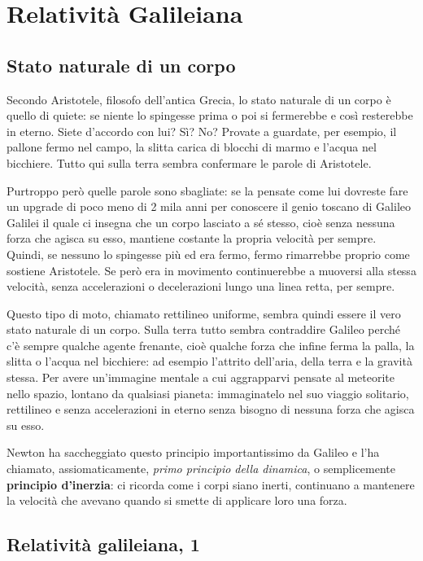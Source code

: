 ﻿
\chapter{Relatività Galileiana}

\section{Stato naturale di un corpo}

Secondo Aristotele, filosofo dell’antica Grecia,  lo stato naturale di un corpo è quello di quiete: se niente lo spingesse prima o poi si fermerebbe e così resterebbe in eterno. Siete d’accordo con lui? Sì? No? Provate a guardate, per esempio, il pallone fermo nel campo, la slitta carica di blocchi di marmo e l’acqua nel bicchiere. Tutto qui sulla terra sembra confermare le parole di Aristotele.

Purtroppo però quelle parole sono sbagliate: se la pensate come lui dovreste fare un upgrade di poco meno di 2 mila anni per  conoscere il genio toscano di Galileo Galilei il quale ci insegna che un corpo lasciato a sé stesso, cioè senza nessuna forza che agisca su esso, mantiene costante la propria velocità per sempre. Quindi, se nessuno lo spingesse più ed era fermo, fermo rimarrebbe proprio come sostiene Aristotele. Se però era in movimento continuerebbe a muoversi alla stessa velocità, senza accelerazioni o decelerazioni lungo una linea retta, per sempre. 

Questo tipo di moto, chiamato rettilineo uniforme, sembra quindi essere il vero stato naturale di un corpo. Sulla terra tutto sembra contraddire Galileo perché c’è sempre qualche agente frenante, cioè qualche forza che infine ferma la palla, la slitta o l'acqua nel bicchiere: ad esempio l’attrito dell’aria, della terra e la gravità stessa. Per avere un'immagine mentale a cui aggrapparvi pensate al meteorite nello spazio, lontano da qualsiasi pianeta: immaginatelo nel suo viaggio solitario, rettilineo e senza accelerazioni in eterno senza bisogno di nessuna forza che agisca su esso.

Newton ha saccheggiato questo principio importantissimo da Galileo e l'ha chiamato, assiomaticamente, \textit{primo principio della dinamica}, o semplicemente \textbf{principio d’inerzia}: ci ricorda come i corpi siano inerti, continuano a mantenere la velocità che avevano quando si smette di applicare loro una forza.


\section{Relatività galileiana, 1}

